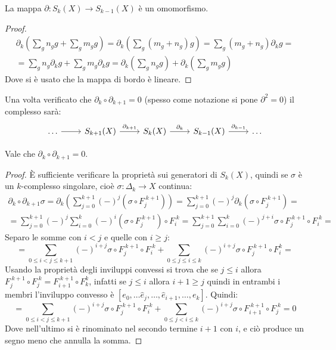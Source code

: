 \begin{proposition}
  La mappa $ \partial \colon S_k(X) \to S_{k-1}(X) $ è un omomorfismo.
\end{proposition}
\begin{proof}
  \begin{gather*}
    \partial_k \left( \sum_g n_g g + \sum_g m_g g\right) = \partial_k \left( \sum_g(m_g + n_g)g \right) = \sum_g (m_g + n_g) \partial_k g = \\
    = \sum_g n_g \partial_k g + \sum_g m_g \partial_k g = \partial_k \left( \sum_g n_g g\right) + \partial_k \left( \sum_g m_g g \right)
  \end{gather*}
  Dove si è usato che la mappa di bordo è lineare.
\end{proof}
\eproof
Una volta verificato che $ \partial_k \circ \partial_{k+1} = 0 $ (spesso come notazione si pone $ \partial^2 = 0 $)
il complesso sarà:
\[
  \begin{tikzcd}
    \dots \rar & S_{k+1}(X) \arrow{r}{\partial_{k+1}} & S_k(X) \arrow{r}{\partial_k} & S_{k-1}(X) \arrow{r}{\partial_{k-1}} & \dots
  \end{tikzcd}
\]
\vspace*{-12pt}
\begin{proposition}
  Vale che $ \partial_k \circ \partial_{k+1} = 0 $.
\end{proposition}
\begin{proof}
  È sufficiente verificare la proprietà sui generatori di $ S_k(X) $, quindi se
  $ \sigma $ è un $ k $-complesso singolare, cioè $ \sigma : \Delta_k \to X $ continua:
  \begin{gather*}
    \partial_k \circ \partial_{k+1} \sigma = \partial_k \left( \sum_{j=0}^{k+1}(-)^j (\sigma \circ F_j^{\; k+1}) \right) =  \sum_{j=0}^{k+1}(-)^j \partial_k (\sigma \circ F_j^{\; k+1}) = \\
    = \sum_{j=0}^{k+1} (-)^j \sum_{i=0}^k (-)^i (\sigma \circ F_j^{\; k+1}) \circ F_i^{\; k} = \sum_{j = 0}^{k+1} \sum_{i = 0}^{k} (-)^{j+i} \sigma \circ F_j^{\; k+1} \circ F_{i}^{\; k} =
  \end{gather*}
  Separo le somme con $ i < j $ e quelle con $ i \geq j $:
  \[
    = \sum_{0 \leq i < j \leq k + 1} (-)^{i+j} \sigma \circ F_j^{\; k+1} \circ F_i^{\; k} + \sum_{0 \leq j \leq i \leq k} (-)^{i+j} \sigma \circ F_j^{\; k+1} \circ F_i^k =
  \]
  Usando la proprietà degli inviluppi convessi si trova che se $ j \leq i $ allora
  $ F_j^{\; k+1} \circ F_j^{\; k} = F_{i+1}^{\; k+1} \circ F_k^{k} $, infatti se
  $ j \leq i $ allora $ i + 1 \geq j $ quindi in entrambi i membri l'inviluppo convesso è
  $ [e_0, \dots \hat{e}_j, \dots, \hat{e}_{i+1}, \dots, e_k] $. Quindi:
  \[
    = \sum_{0 \leq i < j \leq k + 1} (-)^{i+j} \sigma \circ F_j^{\; k+1} \circ F_i^{\; k} + \sum_{0 \leq j < i \leq k} (-)^{i+j} \sigma \circ F_{i+1}^{\; k+1} \circ F_j^{\; k}  =  0
  \]
  Dove nell'ultimo si è rinominato nel secondo termine $ i + 1 $ con $ i $, e ciò produce un segno
  meno che annulla la somma.
\end{proof}


